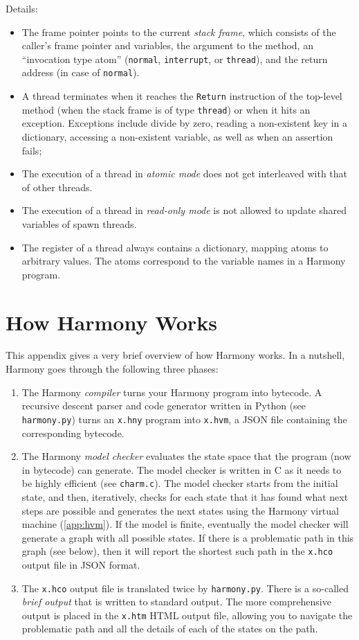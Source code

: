 \documentclass{report}
\begin{document}
Details:
\begin{itemize}
\item The frame pointer points to the current \emph{stack frame},
which consists of the caller's frame pointer and variables, the argument to
the method, an ``invocation type atom'' (\texttt{normal}, \texttt{interrupt}, or
\texttt{thread}), and the return address (in case of \texttt{normal}).
\item A thread terminates when it reaches the \texttt{Return} instruction
of the top-level method (when the stack frame is of type \texttt{thread})
or when it hits an exception.  Exceptions include divide by zero,
reading a non-existent key in a dictionary, accessing a non-existent
variable, as well as when an assertion fails;
\item The execution of a thread in \emph{atomic mode} does not get interleaved
with that of other threads.
\item The execution of a thread in \emph{read-only mode} is not allowed
to update shared variables of spawn threads.
\item The register of a thread always contains a dictionary, mapping
atoms to arbitrary values.  The atoms correspond to the variable names
in a Harmony program.
\end{itemize}

\chapter{How Harmony Works}\label{app:howitworks}

This appendix gives a very brief overview of how Harmony works.
In a nutshell, Harmony goes through the following three phases:

\begin{enumerate}
\item The Harmony \emph{compiler} turns your Harmony program into
bytecode.  A recursive descent parser and code generator written in
Python (see \texttt{harmony.py}) turns an \texttt{x.hny} program
into \texttt{x.hvm}, a JSON file containing the corresponding
bytecode.
\item The Harmony \emph{model checker} evaluates the state space
that the program (now in bytecode) can generate.  The model checker
is written in C as it needs to be highly efficient (see \texttt{charm.c}).
The model checker starts from the initial state, and then, iteratively,
checks for each state that it has found what next steps are possible and
generates the next states using the Harmony virtual machine
(\autoref{app:hvm}).  If the model is finite, eventually the model
checker will generate a graph with all possible states.
If there is a problematic path in this graph (see below), then it will
report the shortest such path in the \texttt{x.hco} output file in JSON
format.
\item The \texttt{x.hco} output file is translated twice by
\texttt{harmony.py}.  There is a so-called \emph{brief output} that
is written to standard output.  The more comprehensive output is placed
in the \texttt{x.htm} HTML output file, allowing you to navigate the
problematic path and all the details of each of the states on the path.
\end{enumerate}
\end{document}
